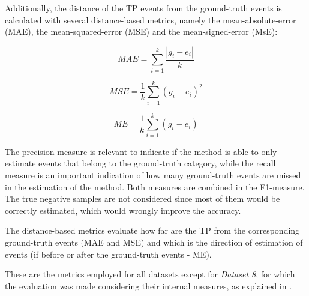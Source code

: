 
Additionally, the distance of the TP events from the ground-truth events is calculated with several distance-based metrics, namely the mean-absolute-error (MAE), the mean-squared-error (MSE) and the mean-signed-error (MsE):

\begin{equation}
    MAE = \sum^{k}_{i=1} \frac{|g_{i} - e_{i}|}{k}
\end{equation}

\begin{equation}
    MSE = \frac{1}{k} \sum^{k}_{i=1} (g_{i} - e_{i})^2
\end{equation}

\begin{equation}
    ME = \frac{1}{k} \sum^{k}_{i=1} (g_{i} - e_{i})
\end{equation}

The precision measure is relevant to indicate if the method is able to only estimate events that belong to the ground-truth category, while the recall measure is an important indication of how many ground-truth events are missed in the estimation of the method. Both measures are combined in the F1-measure. The true negative samples are not considered since most of them would be correctly estimated, which would wrongly improve the accuracy.
\par
The distance-based metrics evaluate how far are the TP from the corresponding ground-truth events (MAE and MSE) and which is the direction of estimation of events (if before or after the ground-truth events - ME).
\par
These are the metrics employed for all datasets except for \textit{Dataset 8}, for which the evaluation was made considering their internal measures, as explained in \cite{cpd_alan}.




